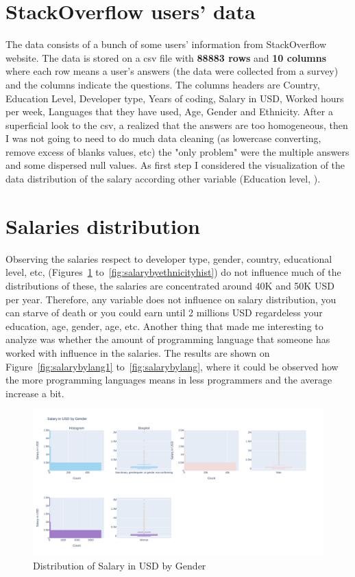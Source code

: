 \documentclass{article}
\begin{document}
\section{StackOverflow users' data}
The data consists of a bunch of some users' information from StackOverflow website. The data is stored on a csv file with \textbf{88883 rows} and \textbf{10 columns} where each row means a user's answers (the data were collected from a survey) and the columns indicate the questions. The columns headers are Country, Education Level, Developer type, Years of coding, Salary in USD, Worked hours per week, Languages that they have used, Age, Gender and Ethnicity.
After a superficial look to the csv, a realized that the answers are too homogeneous, then I was not going to need to do much data cleaning (as lowercase converting, remove excess of blanks values, etc) the "only problem" were the multiple answers and some dispersed null values.
As first step I considered the visualization of the data distribution of the salary according other variable (Education level, ).
\section{Salaries distribution}
Observing the salaries respect to developer type, gender, country, educational level, etc, (Figures~\ref{fig:salarybygenderhist} to~\ref{fig:salarybyethnicityhist}) do not influence much of the distributions of these, the salaries are concentrated around 40K and 50K USD per year. Therefore, any variable does not influence on salary distribution, you can starve of death or you could earn until 2 millions USD regardeless your education, age, gender, age, etc.
Another thing that made me interesting to analyze was whether the amount of programming language that someone has worked with influence in the salaries. The results are shown on Figure~\ref{fig:salarybylang1} to~\ref{fig:salarybylang}, where it could be observed how the more programming languages means in less programmers and the average increase a bit.
\begin{figure}[ht]
    \centering
    \includegraphics[width=\textwidth]{images/salary_gender_hist.pdf}
    \caption{Distribution of Salary in USD by Gender}
    \label{fig:salarybygenderhist}
\end{figure}
\end{document}
